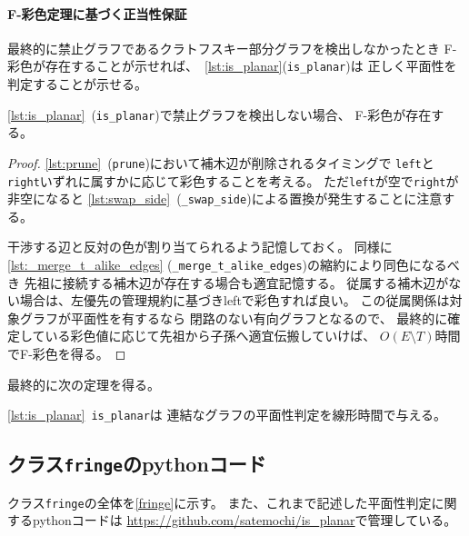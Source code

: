 \paragraph{F-彩色定理に基づく正当性保証}
最終的に禁止グラフであるクラトフスキー部分グラフを検出しなかったとき
F-彩色が存在することが示せれば、\
\lstrefname\ref{lst:is_planar}({\tt is\_planar})は
正しく平面性を判定することが示せる。

\begin{lemma}
\lstrefname\ref{lst:is_planar}~({\tt is\_planar})で禁止グラフを検出しない場合、
F-彩色が存在する。
\end{lemma}

\begin{proof}
\lstrefname\ref{lst:prune}~({\tt prune})において補木辺が削除されるタイミングで
{\tt left}と{\tt right}いずれに属すかに応じて彩色することを考える。
ただ{\tt left}が空で{\tt right}が非空になると
\lstrefname\ref{lst:swap_side}~({\tt \_swap\_side})による置換が発生することに注意する。

干渉する辺と反対の色が割り当てられるよう記憶しておく。
同様に\lstrefname\ref{lst:_merge_t_alike_edges}
({\tt \_merge\_t\_alike\_edges})の縮約により同色になるべき
先祖に接続する補木辺が存在する場合も適宜記憶する。
従属する補木辺がない場合は、左優先の管理規約に基づき{\sf left}で彩色すれば良い。
この従属関係は対象グラフが平面性を有するなら
閉路のない有向グラフとなるので、
最終的に確定している彩色値に応じて先祖から子孫へ適宜伝搬していけば、
$O(E\setminus T)$時間でF-彩色を得る。
\end{proof}

最終的に次の定理を得る。

\begin{theorem}
\lstrefname\ref{lst:is_planar}~{\tt is\_planar}は
連結なグラフの平面性判定を線形時間で与える。
\end{theorem}


\subsection{クラス{\tt fringe}のpythonコード}
クラス{\tt fringe}の全体を\lstrefname\ref{fringe}に示す。
また、これまで記述した平面性判定に関するpythonコードは
\url{https://github.com/satemochi/is_planar}で管理している。

